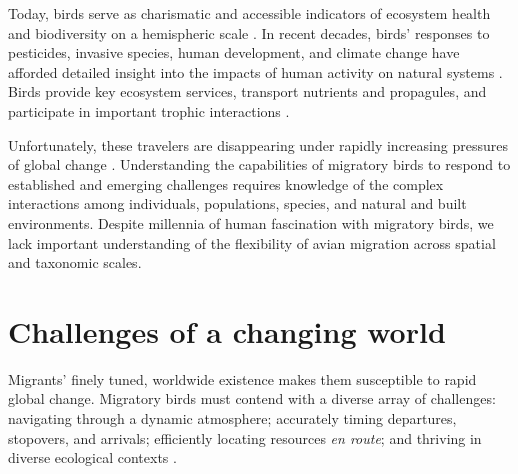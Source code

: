 \documentclass[a4paper, nobind]{templates/ociamthesis}
\begin{document}
Today, birds serve as charismatic and accessible indicators of ecosystem health and biodiversity on a hemispheric scale \autocite{canterburyBirdCommunitiesHabitat2000,oconnellBirdGuildsIndicators2000,gregoryDevelopingIndicatorsEuropean2005,butchartGlobalBiodiversityIndicators2010}. In recent decades, birds' responses to pesticides, invasive species, human development, and climate change have afforded detailed insight into the impacts of human activity on natural systems \autocite{wursterBirdMortalitySpraying1965,gregoryIndicatorImpactClimatic2009,butchartGlobalBiodiversityIndicators2010,rosenbergDeclineNorthAmerican2019}. Birds provide key ecosystem services, transport nutrients and propagules, and participate in important trophic interactions \autocite{whelanEcosystemServicesProvided2008,bauerMigratoryAnimalsCouple2014}.

Unfortunately, these travelers are disappearing under rapidly increasing pressures of global change \autocite{sandersonLongtermPopulationDeclines2006,bairleinMigratoryBirdsThreat2016,rosenbergDeclineNorthAmerican2019}. Understanding the capabilities of migratory birds to respond to established and emerging challenges requires knowledge of the complex interactions among individuals, populations, species, and natural and built environments. Despite millennia of human fascination with migratory birds, we lack important understanding of the flexibility of avian migration across spatial and taxonomic scales.

\hypertarget{challenges-of-a-changing-world}{%
\section*{Challenges of a changing world}\label{challenges-of-a-changing-world}}

Migrants' finely tuned, worldwide existence makes them susceptible to rapid global change. Migratory birds must contend with a diverse array of challenges: navigating through a dynamic atmosphere; accurately timing departures, stopovers, and arrivals; efficiently locating resources \emph{en route}; and thriving in diverse ecological contexts \autocite{newtonMigrationEcologyBirds2008}.
\end{document}
